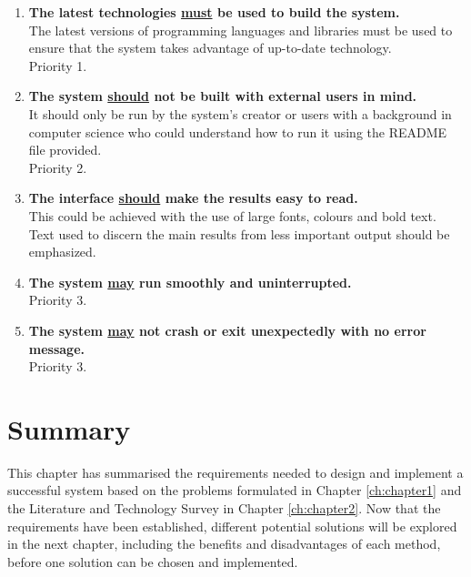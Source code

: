 \begin{enumerate}[label=NF\arabic*]

    \item \textbf{The latest technologies \underline{must} be used to build the system.}\\
	The latest versions of programming languages and libraries must be used to ensure that the system takes advantage of up-to-date technology.\\
	Priority 1.
	
	\item \textbf{The system \underline{should} not be built with external users in mind.}\\
	It should only be run by the system's creator or users with a background in computer science who could understand how to run it using the README file provided.\\
	Priority 2.

    \item \textbf{The interface \underline{should} make the results easy to read.}\\
    This could be achieved with the use of large fonts, colours and bold text. Text used to discern the main results from less important output should be emphasized.
    
    \item \textbf{The system \underline{may} run smoothly and uninterrupted.}\\
    Priority 3.
    
    \item \textbf{The system \underline{may} not crash or exit unexpectedly with no error message.}\\
    Priority 3.

\end{enumerate}

\section{Summary}

This chapter has summarised the requirements needed to design and implement a successful system based on the problems formulated in Chapter \ref{ch:chapter1} and the Literature and Technology Survey in Chapter \ref{ch:chapter2}. Now that the requirements have been established, different potential solutions will be explored in the next chapter, including the benefits and disadvantages of each method, before one solution can be chosen and implemented.